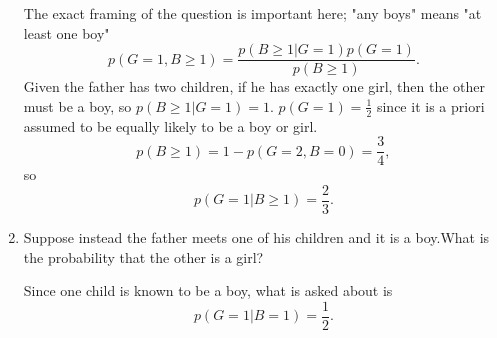 \begin{example}
\begin{enumerate}
		The exact framing of the question is important here; "any boys" means "at least one boy"
		\begin{equation}
			p(G=1,B\geq 1) = \frac{p(B\geq1|G=1)p(G=1)}{p(B\geq 1)}.
		\end{equation}
		Given the father has two children, if he has exactly one girl, then the other must be a boy, so $p(B\geq 1|G=1)=1$. $p(G=1)=\frac{1}{2}$ since it is a priori assumed to be equally likely to be a boy or girl. 
		\begin{equation}
			p(B\geq 1)=1-p(G=2,B=0)=\frac{3}{4},
		\end{equation}
		so
		\begin{equation}
			p(G=1|B\geq 1) = \frac{2}{3}.
		\end{equation}
		
		\item Suppose instead the father meets one of his children and it is a boy.What is the probability that the other is a girl?
		
		Since one child is known to be a boy, what is asked about is
		\begin{equation}
			p(G=1|B=1)=\frac{1}{2}.
		\end{equation}
	\end{enumerate}
\end{example}


